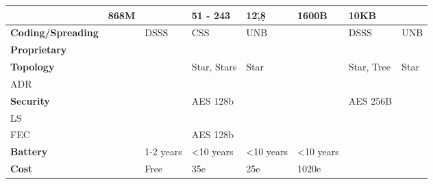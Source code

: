 \begin{longtable}{l|l|l|l|l|l|l|l}
	\                                    & 868M             & \ko          & 51 - 243               & 12\u,8\d      & 1600B                                  & 10KB              & \ko             \\\hline
	\bf{Coding/Spreading}                &                  & \ac{DSSS}    & \ac{CSS}               & \ac{UNB}      & \ko                                    & \ac{DSSS}         & \ac{UNB}        \\\hline
	\bf{Proprietary}                     &                  & \ko          & \ko                    & \ok           & \ko                                    & \ko               & \ko             \\\hline
	\bf{Topology}                        & \                & \ko          & Star, Stars            & Star          & \ko                                    & Star, Tree        & Star            \\\hline
	\ac{ADR}                             & \                & \ko          & \ok                    & \ko           & \ko                                    & \ok               & \ko             \\\hline
	\bf{Security}                        & \                & \ko          & AES 128b               & \ko           & \ko                                    & AES 256B & \ko             \\\hline
	\ac{LS}                              & \                & \ko          & \ok                    & \ko           & \ko                                    & \ko               & \ko             \\\hline
	\ac{FEC}                             & \                & \ko          & AES 128b               & \ko           & \ko                                    & \ok               & \ko             \\\hline
	\bf{Battery}                         & \                & 1-2	years    & <10 years              & <10 years     & <10 years                              &                   & \\\hline
	\bf{Cost}                            &                  & Free         & 35e                    & 25e           & 1020e                                  &                   & \\\hline

\end{longtable}
